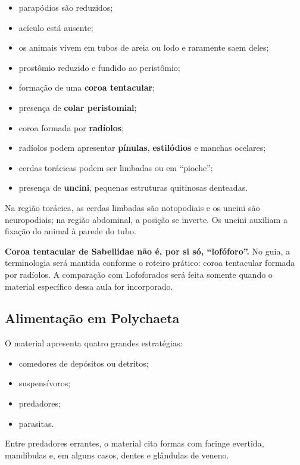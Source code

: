 \documentclass[a4paper,12pt]{article}
\newcommand{\termo}[1]{\textbf{#1}}
\begin{document}
\begin{itemize}
  \item parapódios são reduzidos;
  \item acículo está ausente;
  \item os animais vivem em tubos de areia ou lodo e raramente saem deles;
  \item prostômio reduzido e fundido ao peristômio;
  \item formação de uma \termo{coroa tentacular};
  \item presença de \termo{colar peristomial};
  \item coroa formada por \termo{radíolos};
  \item radíolos podem apresentar \termo{pínulas}, \termo{estilódios} e manchas ocelares;
  \item cerdas torácicas podem ser limbadas ou em ``pioche'';
  \item presença de \termo{uncini}, pequenas estruturas quitinosas denteadas.
\end{itemize}

Na região torácica, as cerdas limbadas são notopodiais e os uncini são neuropodiais; na região abdominal, a posição se inverte. Os uncini auxiliam a fixação do animal à parede do tubo.

\begin{atencao}
\textbf{Coroa tentacular de Sabellidae não é, por si só, ``lofóforo''.} No guia, a terminologia será mantida conforme o roteiro prático: coroa tentacular formada por radíolos. A comparação com Lofoforados será feita somente quando o material específico dessa aula for incorporado.
\end{atencao}

\subsection{Alimentação em Polychaeta}

O material apresenta quatro grandes estratégias:

\begin{itemize}
  \item comedores de depósitos ou detritos;
  \item suspensívoros;
  \item predadores;
  \item parasitas.
\end{itemize}

Entre predadores errantes, o material cita formas com faringe evertida, mandíbulas e, em alguns casos, dentes e glândulas de veneno.
\end{document}
